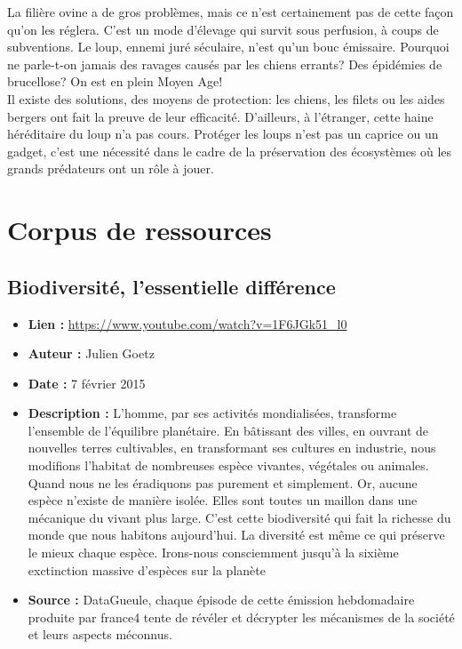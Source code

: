 \documentclass[8pt]{article}
\begin{document}
La filière ovine a de gros problèmes, mais ce n'est certainement pas de cette façon qu'on les réglera. C'est un mode d'élevage qui survit sous perfusion, à coups de subventions. Le loup, ennemi juré séculaire, n'est qu'un bouc émissaire. Pourquoi ne parle-t-on jamais des ravages causés par les chiens errants? Des épidémies de brucellose? On est en plein Moyen Age! \\

Il existe des solutions, des moyens de protection: les chiens, les filets ou les aides bergers ont fait la preuve de leur efficacité. D'ailleurs, à l'étranger, cette haine héréditaire du loup n'a pas cours. Protéger les loups n'est pas un caprice ou un gadget, c'est une nécessité dans le cadre de la préservation des écosystèmes où les grands prédateurs ont un rôle à jouer. 

\newpage
\section{Corpus de ressources}
\subsection{Biodiversité, l'essentielle différence}
 
\begin{itemize}
	\item \textbf{Lien : }  \url{https://www.youtube.com/watch?v=1F6JGk51_l0} 
	\item \textbf{Auteur : } Julien Goetz
	\item \textbf{Date : } 7 février 2015
	\item \textbf{Description : } L'homme, par ses activités mondialisées, transforme l'ensemble de l'équilibre planétaire. En bâtissant des villes, en ouvrant de nouvelles terres cultivables, en transformant ses cultures en industrie, nous modifions l'habitat de nombreuses espèce vivantes, végétales ou animales. Quand nous ne les éradiquons pas purement et simplement. Or, aucune espèce n'existe de manière isolée. Elles sont toutes un maillon dans une mécanique du vivant plus large. C'est cette biodiversité qui fait la richesse du monde que nous habitons aujourd'hui. La diversité est même ce qui préserve le mieux chaque espèce. Irons-nous consciemment jusqu'à la sixième exctinction massive d'espèces sur la planète
	\item \textbf{Source : } DataGueule, chaque épisode de cette émission hebdomadaire produite par france4 tente de révéler et décrypter les mécanismes de la société et leurs aspects méconnus.
\end{itemize}
\end{document}

